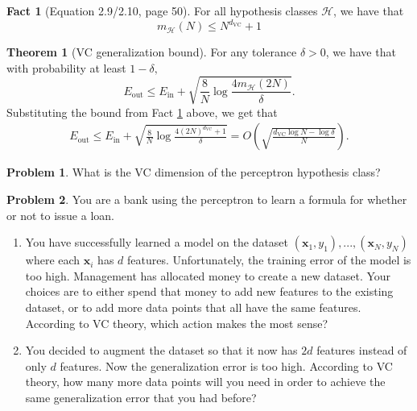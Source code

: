 \documentclass[10pt]{exam}
\theoremstyle{definition}
\newtheorem{problem}{Problem}
\newtheorem{fact}{Fact}
\newtheorem{theorem}{Theorem}
\newcommand{\Ein}{E_{\text{in}}}
\newcommand{\Eout}{E_{\text{out}}}
\newcommand{\x}{\mathbf x}
\newcommand{\mH}{m_{\mathcal H}}
\newcommand{\dvc}{{d_{\text{VC}}}}
\begin{document}
\begin{fact}[Equation 2.9/2.10, page 50]
    \label{fact:2.10}
    For all hypothesis classes $\mathcal H$, we have that
    \begin{equation}
        \label{eq:mHdvc}
        \mH(N) \le N^\dvc + 1
    \end{equation}
\end{fact}

\vspace{3in}
\begin{theorem}[VC generalization bound]
    For any tolerance $\delta>0$, we have that with probability at least $1-\delta,$
    \begin{equation}
        \Eout \le \Ein + \sqrt{\frac8N \log\frac{4\mH(2N)}{\delta}}.
    \end{equation}
    Substituting the bound from Fact \ref{fact:2.10} above,
    we get that
    \begin{align}
        \Eout 
        \le \Ein + \sqrt{\frac8N \log\frac{4(2N)^\dvc + 1}{\delta}} 
        = O\left(\sqrt{\frac{\dvc\log N - \log\delta}{N}}\right).
    \end{align}

\end{theorem}

\newpage
\begin{problem}
    What is the VC dimension of the perceptron hypothesis class?
\end{problem}

\newpage
\begin{problem}
    You are a bank using the perceptron to learn a formula for whether or not to issue a loan.
    \begin{enumerate}
        \item
            You have successfully learned a model on the dataset $(\x_1,y_1), ..., (\x_N,y_N)$ where each $\x_i$ has $d$ features.
            Unfortunately, the training error of the model is too high.
            Management has allocated money to create a new dataset.
            Your choices are to either spend that money to add new features to the existing dataset,
            or to add more data points that all have the same features.
            According to VC theory, which action makes the most sense?

            \vspace{4in}
        \item
            You decided to augment the dataset so that it now has $2d$ features instead of only $d$ features.
            Now the generalization error is too high.
            According to VC theory, how many more data points will you need in order to achieve the same generalization error that you had before?
    \end{enumerate}
\end{problem}
\end{document}
